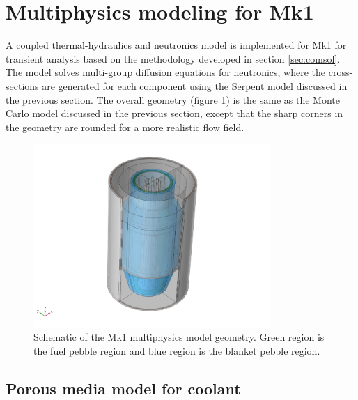\documentclass{elsarticle}
\begin{document}







\section{Multiphysics modeling for Mk1}
\label{sec:comsol_mk1}


A coupled thermal-hydraulics and neutronics model is implemented for Mk1 for transient analysis based on the methodology developed in section \ref{sec:comsol}. The model solves multi-group diffusion equations for neutronics, where the cross-sections are generated for each component using the Serpent model discussed in the previous section. 
The overall geometry (figure \ref{fig:Mk1_comsol_model}) is the same as the Monte Carlo model discussed in the previous section, except that the sharp corners in the geometry are rounded for a more realistic flow field.


\begin{figure}
    \centering
    \includegraphics[width=0.8\textwidth]{images/diffusion/mk1/Mk1_comsol.png}
    \caption{Schematic of the Mk1 multiphysics model geometry. Green region is the fuel pebble region and blue region is the blanket pebble region.}
    \label{fig:Mk1_comsol_model}
\end{figure}



\subsection{Porous media model for coolant}
\end{document}
